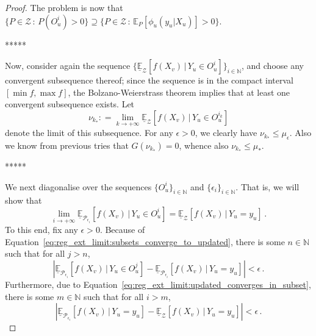 \documentclass[twoside,11pt]{article}
\newcommand{\nats}{\mathbb{N}}
\newcommand{\abs}[1]{\left\vert #1 \right\vert}
\newcommand{\coloneqq}{:\!=}
\begin{document}
\begin{proof}
The problem is now that $\{P\in\mathcal{Z}\,:\,P(O_u^i)>0\}\supseteq \{P\in\mathcal{Z}\,:\,\mathbb{E}_P[\phi_u(y_u\vert X_u)]>0\}$.

*****

Now, consider again the sequence $\{\underline{\mathbb{E}}_{\mathcal{Z}}[f(X_v)\,\vert\,Y_u\in O_u^i]\}_{i\in\nats}$, and choose any convergent subsequence thereof; since the sequence is in the compact interval $[\min f, \max f]$, the Bolzano-Weierstrass theorem implies that at least one convergent subsequence exists. Let
\begin{equation*}
\nu_{k_*} \coloneqq \lim_{k\to+\infty} \underline{\mathbb{E}}_{\mathcal{Z}}[f(X_v)\,\vert\,Y_u\in O_u^{i_k}]
\end{equation*}
denote the limit of this subsequence. For any $\epsilon>0$, we clearly have $\nu_{k_*}\leq \mu_{\epsilon}$. Also we know from previous tries that $G(\nu_{k_*})=0$, whence also $\nu_{k_*}\leq \mu_*$.

*****

We next diagonalise over the sequences $\{O_u^i\}_{i\in\nats}$ and $\{\epsilon_i\}_{i\in\nats}$. That is, we will show that
\begin{equation*}
\lim_{i\to+\infty} \underline{\mathbb{E}}_{\mathcal{P}_{\epsilon_i}}[f(X_v)\,\vert\,Y_u\in O_u^i] = \underline{\mathbb{E}}_{\mathcal{Z}}[f(X_v)\,\vert\,Y_u=y_u]\,.
\end{equation*}
To this end, fix any $\epsilon>0$. Because of Equation~\eqref{eq:reg_ext_limit:subsets_converge_to_updated}, there is some $n\in\nats$ such that for all $j>n$,
\begin{equation*}
\abs{\underline{\mathbb{E}}_{\mathcal{P}_{\epsilon_i}}[f(X_v)\,\vert\,Y_u\in O_u^j] - \underline{\mathbb{E}}_{\mathcal{P}_{\epsilon_i}}[f(X_v)\,\vert\,Y_u=y_u]} < \epsilon\,.
\end{equation*}
Furthermore, due to Equation~\eqref{eq:reg_ext_limit:updated_converges_in_subset}, there is some $m\in\nats$ such that for all $i>m$,
\begin{equation*}
\abs{\underline{\mathbb{E}}_{\mathcal{P}_{\epsilon_i}}[f(X_v)\,\vert\,Y_u=y_u] - \underline{\mathbb{E}}_{\mathcal{Z}}[f(X_v)\,\vert\,Y_u=y_u]} < \epsilon\,.
\end{equation*}



\end{proof}
\end{document}

